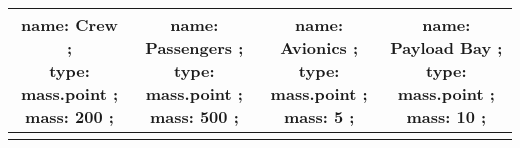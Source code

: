 \FloatBarrier 
 \begin{table}[h] 
 \begin{adjustbox}{width=1\textwidth} 
 \begin{tabular}{|c|c|c|c|}
 \hline 

\makecell{name: Crew ; \\ type: mass.point ; \\ mass: 200 ; \\ } & \makecell{name: Passengers ; \\ type: mass.point ; \\ mass: 500 ; \\ } & \makecell{name: Avionics ; \\ type: mass.point ; \\ mass: 5 ; \\ } & \makecell{name: Payload Bay ; \\ type: mass.point ; \\ mass: 10 ; \\ }\\ \hline \\ 

\end{tabular}
\end{adjustbox}
\end{table}
